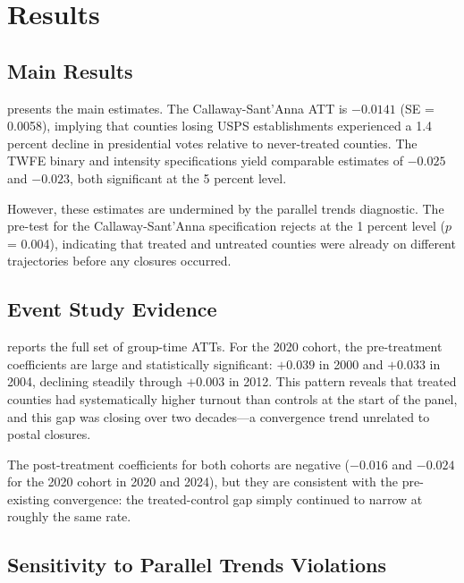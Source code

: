 \documentclass[12pt]{article}
\begin{document}
\section{Results}

\subsection{Main Results}



 presents the main estimates. The Callaway-Sant'Anna ATT is $-0.0141$ (SE = 0.0058), implying that counties losing USPS establishments experienced a 1.4 percent decline in presidential votes relative to never-treated counties. The TWFE binary and intensity specifications yield comparable estimates of $-0.025$ and $-0.023$, both significant at the 5 percent level.

However, these estimates are undermined by the parallel trends diagnostic. The pre-test for the Callaway-Sant'Anna specification rejects at the 1 percent level ($p$ = 0.004), indicating that treated and untreated counties were already on different trajectories before any closures occurred.

\subsection{Event Study Evidence}



 reports the full set of group-time ATTs. For the 2020 cohort, the pre-treatment coefficients are large and statistically significant: $+0.039$ in 2000 and $+0.033$ in 2004, declining steadily through $+0.003$ in 2012. This pattern reveals that treated counties had systematically higher turnout than controls at the start of the panel, and this gap was closing over two decades---a convergence trend unrelated to postal closures.

The post-treatment coefficients for both cohorts are negative ($-0.016$ and $-0.024$ for the 2020 cohort in 2020 and 2024), but they are consistent with the pre-existing convergence: the treated-control gap simply continued to narrow at roughly the same rate.

\subsection{Sensitivity to Parallel Trends Violations}
\end{document}
